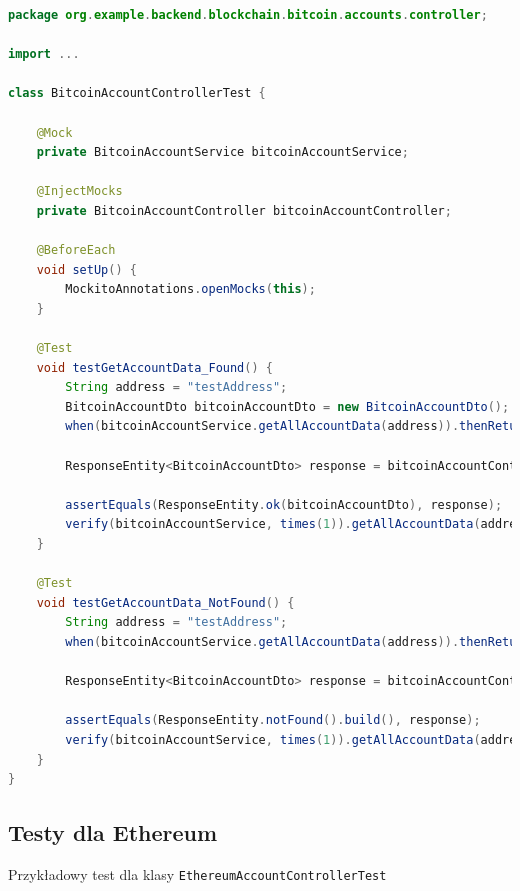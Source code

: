 \begin{lstlisting}[language=Java, style=JavaStyle]
package org.example.backend.blockchain.bitcoin.accounts.controller;

import ...

class BitcoinAccountControllerTest {

    @Mock
    private BitcoinAccountService bitcoinAccountService;

    @InjectMocks
    private BitcoinAccountController bitcoinAccountController;

    @BeforeEach
    void setUp() {
        MockitoAnnotations.openMocks(this);
    }

    @Test
    void testGetAccountData_Found() {
        String address = "testAddress";
        BitcoinAccountDto bitcoinAccountDto = new BitcoinAccountDto();
        when(bitcoinAccountService.getAllAccountData(address)).thenReturn(bitcoinAccountDto);

        ResponseEntity<BitcoinAccountDto> response = bitcoinAccountController.getAccountData(address);

        assertEquals(ResponseEntity.ok(bitcoinAccountDto), response);
        verify(bitcoinAccountService, times(1)).getAllAccountData(address);
    }

    @Test
    void testGetAccountData_NotFound() {
        String address = "testAddress";
        when(bitcoinAccountService.getAllAccountData(address)).thenReturn(null);

        ResponseEntity<BitcoinAccountDto> response = bitcoinAccountController.getAccountData(address);

        assertEquals(ResponseEntity.notFound().build(), response);
        verify(bitcoinAccountService, times(1)).getAllAccountData(address);
    }
}
\end{lstlisting}

\subsection{Testy dla Ethereum}
Przykładowy test dla klasy \texttt{EthereumAccountControllerTest}

